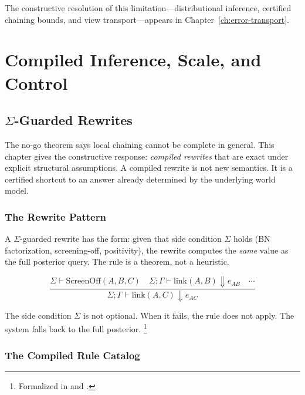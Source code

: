 \documentclass[11pt,openany]{report}
\begin{document}
\noindent
The constructive resolution of this limitation---distributional
inference, certified chaining bounds, and view transport---appears
in Chapter~\ref{ch:error-transport}.


\part{Compiled Inference, Scale, and Control}
\label{part:compiled}

\chapter{\texorpdfstring{$\Sigma$}{Sigma}-Guarded Rewrites}
\label{ch:sigma-rewrites}

The no-go theorem says local chaining cannot be complete in general.
This chapter gives the constructive response: \emph{compiled
rewrites} that are exact under explicit structural assumptions.  A
compiled rewrite is not new semantics.  It is a certified shortcut to
an answer already determined by the underlying world model.

\section{The Rewrite Pattern}

A $\Sigma$-guarded rewrite has the form: given that side condition
$\Sigma$ holds (BN factorization, screening-off, positivity), the
rewrite computes the \emph{same} value as the full posterior query.
The rule is a theorem, not a heuristic.

\[
\frac{\Sigma \vdash \mathrm{ScreenOff}(A, B, C) \quad
      \Sigma; \Gamma \vdash \mathrm{link}(A, B) \Downarrow e_{AB}
      \quad \cdots}
     {\Sigma; \Gamma \vdash \mathrm{link}(A, C) \Downarrow e_{AC}}
\]

\noindent
The side condition $\Sigma$ is not optional.  When it fails, the
rule does not apply.  The system falls back to the full posterior.%
\footnote{Formalized in
 and
.}

\section{The Compiled Rule Catalog}
\end{document}

